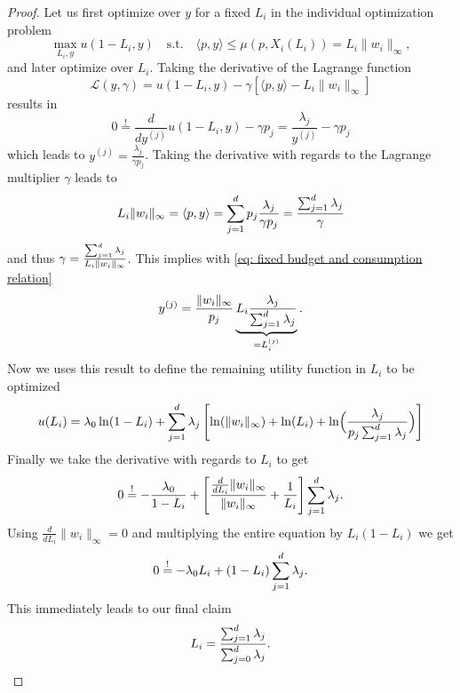 \begin{proof}
	Let us first optimize over \(y\) for a fixed \(L_i\) in the individual
	optimization problem
	\[
		\max_{L_i, y} u(1-L_i, y)
		\quad \text{s.t.}\quad
		\langle p, y\rangle \le \mu(p, X_i(L_i)) = L_i \|w_i\|_\infty,
	\]
	and later optimize over \(L_i\). Taking the derivative of the Lagrange
	function
	\[
		\mathcal{L}	(y, \gamma)
		= u(1-L_i, y) - \gamma [\langle p, y\rangle - L_i\|w_i\|_\infty]
	\]
	results in
	\[
		0\overset!= \frac{d}{d y^{(j)}}u(1-L_i,y) - \gamma p_j
		= \frac{\lambda_j}{y^{(j)}} - \gamma p_j
	\]
	which leads to \(y^{(j)} = \frac{\lambda_j}{\gamma p_j}\). Taking the
	derivative with regards to the Lagrange multiplier \(\gamma\) leads to
	\[
		L_i\|w_i\|_\infty = \langle p, y\rangle
		= \sum_{j=1}^d p_j \frac{\lambda_j}{\gamma p_j}
		= \frac{\sum_{j=1}^d \lambda_j}\gamma
	\]
	and thus \(\gamma = \frac{\sum_{j=1}^d \lambda_j}{L_i\|w_i\|_\infty}\).
	This implies with \eqref{eq: fixed budget and consumption relation}
	\[
		y^{(j)}
		= \frac{\|w_i\|_\infty}{p_j}
		\underbrace{L_i\frac{\lambda_j}{\sum_{j=1}^d \lambda_j}}_{=L_i^{(j)}}.
	\]
	Now we uses this result to define the remaining utility function in \(L_i\) 
	to be optimized
	\[
		u(L_i) = \lambda_0 \ln(1-L_i) + \sum_{j=1}^d \lambda_j \left[
			\ln(\|w_i\|_\infty) + \ln(L_i) + \ln\Bigl(\frac{\lambda_j}{p_j\sum_{j=1}^d \lambda_j}\Bigr)
		\right]
	\]
	Finally we take the derivative with regards to \(L_i\) to get
	\[
		0\overset!= -\frac{\lambda_0}{1-L_i}
		+ \left[
			\frac{\frac{d}{dL_i}\|w_i\|_\infty}{\|w_i\|_\infty}
			+ \frac1{L_i}
		\right]\sum_{j=1}^d \lambda_j.
	\]
	Using \(\frac{d}{dL_i}\|w_i\|_\infty = 0\) 
	and multiplying the entire equation by \(L_i(1-L_i)\) we get
	\[
		0\overset!= -\lambda_0L_i + (1-L_i)\sum_{j=1}^d \lambda_j.
	\]
	This immediately leads to our final claim
	\[
		L_i = \frac{\sum_{j=1}^d \lambda_j}{\sum_{j=0}^d \lambda_j}.
		\qedhere
	\]
\end{proof}


